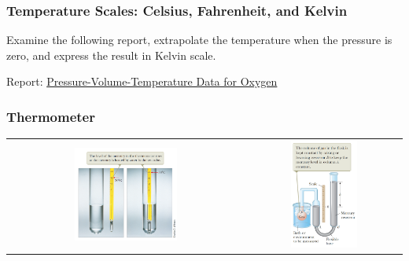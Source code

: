 \documentclass[10pt]{beamer}
\begin{document}
\begin{frame}
\frametitle{Temperature Scales: Celsius, Fahrenheit, and Kelvin}
Examine the following report, extrapolate the temperature when the pressure is zero, and express the result in Kelvin scale.

Report: \href{./Pressure-Volume-Temperature Data for Oxygen.pdf}{Pressure-Volume-Temperature Data for Oxygen}
\end{frame}

\begin{frame}
\frametitle{Thermometer}
\begin{tabular}{cc}
\includegraphics[width=0.45\textwidth]{mercury-thermometer.png}&\pause
\includegraphics[width=0.45\textwidth]{constant-volume-thermometer.png}
\end{tabular}
\end{frame}
\end{document}
